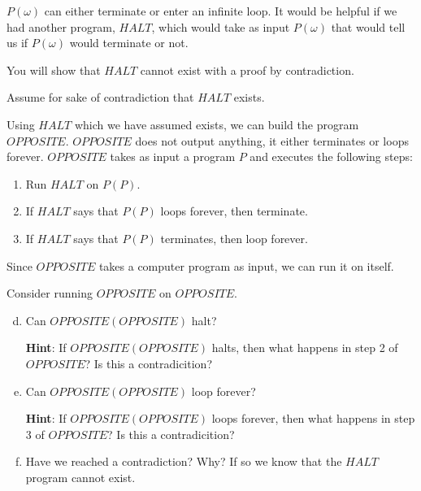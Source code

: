 \documentclass[12pt,letterpaper]{article}
\newcommand\hint[1]{\textbf{Hint}: #1}
\begin{document}
	$P(\omega)$ can either terminate or enter an infinite loop. It would be helpful if we had another program, $HALT$, which would take as input $P(\omega)$ that would tell us if $P(\omega)$ would terminate or not.

	You will show that $HALT$ cannot exist with a proof by contradiction.

	Assume for sake of contradiction that $HALT$ exists.

	Using $HALT$ which we have assumed exists, we can build the program $OPPOSITE$. $OPPOSITE$ does not output anything, it either terminates or loops forever. $OPPOSITE$ takes as input a program $P$ and executes the following steps:
	\begin{enumerate}[(1)]
		\item Run $HALT$ on $P(P)$.
		\item If $HALT$ says that $P(P)$ loops forever, then terminate.
		\item If $HALT$ says that $P(P)$ terminates, then loop forever.
	\end{enumerate}

	Since $OPPOSITE$ takes a computer program as input, we can run it on itself.

	Consider running $OPPOSITE$ on $OPPOSITE$.

	\begin{enumerate}[a.]
		\setcounter{enumi}{3}
		\item Can $OPPOSITE(OPPOSITE)$ halt?
		
	\hint{If $OPPOSITE(OPPOSITE)$ halts, then what happens in step 2 of $OPPOSITE$? Is this a contradicition?}

			\begin{mdframed}
		\vspace{3.6cm}
		\end{mdframed}

		\item Can $OPPOSITE(OPPOSITE)$ loop forever?

	\hint{If $OPPOSITE(OPPOSITE)$ loops forever, then what happens in step 3 of $OPPOSITE$? Is this a contradicition?}

		\begin{mdframed}
		\vspace{3cm}
		\end{mdframed}

	\item Have we reached a contradiction? Why? If so we know that the $HALT$ program cannot exist.

		\begin{mdframed}
		\vspace{3cm}
		\end{mdframed}
	
	\end{enumerate}
	

	



	

	

	

	
	
  
\end{document}
